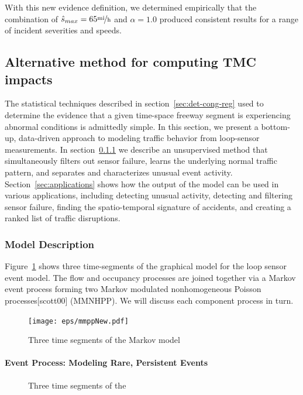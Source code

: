 \documentclass[12pt]{report}
\newcounter{time}
\newcounter{space}
\begin{document}
With this new evidence definition, we determined empirically that the
combination of $\hat{s}_{max}=65\unitfrac{mi}{h}$ and $\alpha=1.0$
produced consistent results for a range of incident severities and
speeds.


\subsection{Alternative method for computing TMC impacts}
\label{sec:alt-tmc-meth}

The statistical techniques described in section~\ref{sec:det-cong-reg}
used to determine the evidence that a given time-space freeway segment
is experiencing abnormal conditions is admittedly simple.  In this
section, we present a bottom-up, data-driven approach to modeling
traffic behavior from loop-sensor measurements.  In
section~\ref{sec:model} we describe an unsupervised method that
simultaneously filters out sensor failure, learns the underlying
normal traffic pattern, and separates and characterizes unusual event
activity.  Section~\ref{sec:applications} shows how the output of the
model can be used in various applications, including detecting unusual
activity, detecting and filtering sensor failure, finding the
spatio-temporal signature of accidents, and creating a ranked list of
traffic
disruptions.  %

\subsubsection{Model Description}\label{sec:model}
Figure~\ref{fig:model} shows three time-segments of the graphical
model for the loop sensor event model. The flow and occupancy
processes are joined together via a Markov event process forming two
Markov modulated nonhomogeneous Poisson processes[scott00] (MMNHPP).
We will discuss each component process in turn.
\begin{figure}
  \centering
  \texttt{[image: eps/mmppNew.pdf]}
  \caption{Three time segments of the Markov model }\label{fig:model}
\end{figure}




\paragraph{Event Process: Modeling Rare, Persistent Events}\label{sec:event}
\begin{figure}
  \centering
  \caption{Three time segments of the }\label{fig:eventGM}
\end{figure}
\end{document}
